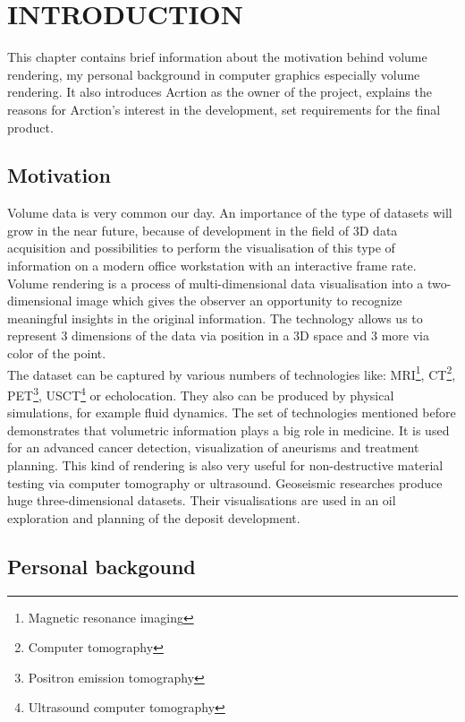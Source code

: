 \documentclass[twoside, english, 11pt]{report}
\begin{document}
\newpage

\tableofcontents

\chapter{INTRODUCTION}
This chapter contains brief information about the motivation behind volume rendering, my personal background in computer graphics especially volume rendering. It also introduces Acrtion as the owner of the project, explains the reasons for Arction's interest in the development, set requirements for the final product.
\section{Motivation}

Volume data is very common our day. An importance of the type of datasets will grow in the near future, because of development in the field of 3D data acquisition and possibilities to perform the visualisation of this type of information on a modern office workstation with an interactive frame rate.\\

Volume rendering is a process of multi-dimensional data visualisation into a two-dimensional image which gives the observer an opportunity to recognize meaningful insights in the original information. The technology allows us to represent 3 dimensions of the data via position in a 3D space and 3 more via color of the point.\\

The dataset can be captured by various numbers of technologies like: MRI\footnote{Magnetic resonance imaging}, CT\footnote{Computer tomography}, PET\footnote{Positron emission tomography}, USCT\footnote{Ultrasound computer tomography} or echolocation. They also can be produced by physical simulations, for example fluid dynamics. The set of technologies mentioned before demonstrates that volumetric information plays a big role in medicine. It is used for an advanced cancer detection, visualization of aneurisms and treatment planning. This kind of rendering is also very useful for non-destructive material testing via computer tomography or ultrasound. Geoseismic researches produce huge three-dimensional datasets. Their visualisations are used in an oil exploration and planning of the deposit development.\\

\section{Personal backgound}
\end{document}
